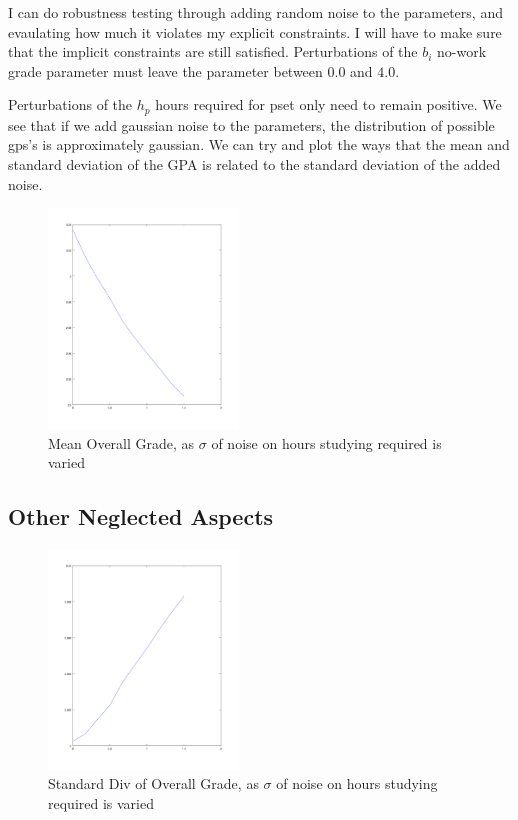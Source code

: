 \documentclass{article}
\begin{document}
I can do robustness testing through adding random noise to the 
	parameters, and evaulating how much it violates my 
	explicit constraints.
I will have to make sure that the implicit constraints are still satisfied.
Perturbations of the $b_i$ no-work grade parameter must leave the 
	parameter between $0.0$ and $4.0$.

Perturbations of the $h_p$ hours required for pset only need to remain positive.
We see that if we add gaussian noise to the parameters, the distribution of 
	possible gps's is approximately gaussian.
We can try and plot the ways that the mean and standard deviation of the GPA
	is related to the standard deviation of the added noise.

\begin{figure}
\begin{center}
\includegraphics[width=0.45\textwidth]{means.png}
\end{center}
\caption{Mean Overall Grade, as $\sigma$ of noise on hours studying required is varied}
\end{figure}
\subsection{Other Neglected Aspects}

\begin{figure}
\begin{center}
\includegraphics[width=0.45\textwidth]{standard-divs.png}
\end{center}
\caption{Standard Div of Overall Grade, as $\sigma$ of noise on hours studying required is varied}
\end{figure}
\end{document}
